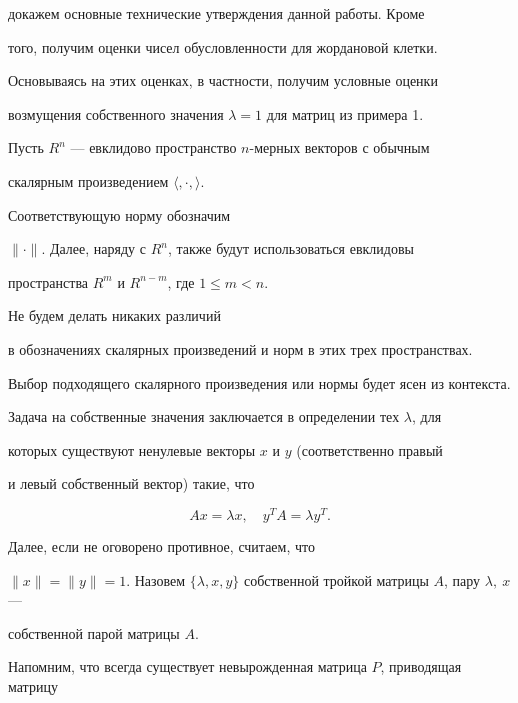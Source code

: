 докажем основные технические утверждения данной работы. Кроме


того, получим оценки чисел обусловленности для жордановой клетки.


Основываясь на этих оценках, в частности, получим условные оценки


возмущения собственного значения $\lambda=1$ для матриц из примера 1.





Пусть $R^n$ --- евклидово пространство $n$-мерных векторов с обычным


скалярным произведением $\langle,\cdot,\rangle$.


Соответствующую норму обозначим


$\|\cdot\|$.  Далее, наряду с $R^n$, также будут использоваться евклидовы


пространства $R^m$ и $R^{n-m}$, где $1\le m<n$.


Не будем делать никаких различий


в обозначениях скалярных произведений и норм в этих трех пространствах.


Выбор подходящего скалярного произведения или нормы будет ясен из контекста.







Задача на собственные значения заключается в определении тех $\lambda$, для


которых существуют ненулевые векторы $x$ и $y$ (соответственно правый


и левый собственный вектор) такие, что


\begin{equation}


Ax=\lambda x,\quad y^T A=\lambda y^T.


\end{equation}


Далее, если не оговорено противное, считаем, что


$\|x\|=\|y\|=1$. Назовем $\{\lambda,


x, y\}$ собственной тройкой матрицы $A$, пару $\lambda,\ x$ ---


собственной парой матрицы $A$.





Напомним, что всегда существует невырожденная матрица $P$, приводящая матрицу


